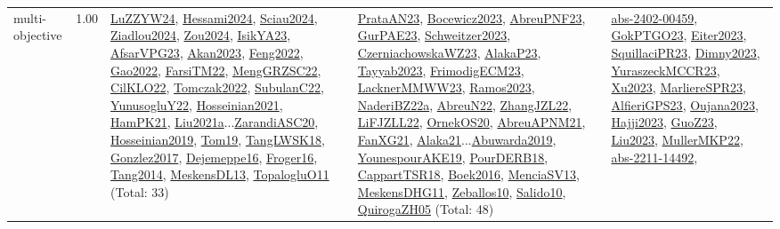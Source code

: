 {\begin{longtable}{p{3cm}r>{\raggedright\arraybackslash}p{6cm}>{\raggedright\arraybackslash}p{6cm}>{\raggedright\arraybackslash}p{8cm}}
\index{multi-objective}\index{Concepts!multi-objective}multi-objective &  1.00 & \hyperref[detail:LuZZYW24]{LuZZYW24}, \hyperref[detail:Hessami2024]{Hessami2024}, \hyperref[detail:Sciau2024]{Sciau2024}, \hyperref[detail:Ziadlou2024]{Ziadlou2024}, \hyperref[detail:Zou2024]{Zou2024}, \hyperref[detail:IsikYA23]{IsikYA23}, \hyperref[detail:AfsarVPG23]{AfsarVPG23}, \hyperref[detail:Akan2023]{Akan2023}, \hyperref[detail:Feng2022]{Feng2022}, \hyperref[detail:Gao2022]{Gao2022}, \hyperref[detail:FarsiTM22]{FarsiTM22}, \hyperref[detail:MengGRZSC22]{MengGRZSC22}, \hyperref[detail:CilKLO22]{CilKLO22}, \hyperref[detail:Tomczak2022]{Tomczak2022}, \hyperref[detail:SubulanC22]{SubulanC22}, \hyperref[detail:YunusogluY22]{YunusogluY22}, \hyperref[detail:Hosseinian2021]{Hosseinian2021}, \hyperref[detail:HamPK21]{HamPK21}, \hyperref[detail:Liu2021a]{Liu2021a}...\hyperref[detail:ZarandiASC20]{ZarandiASC20}, \hyperref[detail:Hosseinian2019]{Hosseinian2019}, \hyperref[detail:Tom19]{Tom19}, \hyperref[detail:TangLWSK18]{TangLWSK18}, \hyperref[detail:Gonzlez2017]{Gonzlez2017}, \hyperref[detail:Dejemeppe16]{Dejemeppe16}, \hyperref[detail:Froger16]{Froger16}, \hyperref[detail:Tang2014]{Tang2014}, \hyperref[detail:MeskensDL13]{MeskensDL13}, \hyperref[detail:TopalogluO11]{TopalogluO11} (Total: 33) & \hyperref[detail:PrataAN23]{PrataAN23}, \hyperref[detail:Bocewicz2023]{Bocewicz2023}, \hyperref[detail:AbreuPNF23]{AbreuPNF23}, \hyperref[detail:GurPAE23]{GurPAE23}, \hyperref[detail:Schweitzer2023]{Schweitzer2023}, \hyperref[detail:CzerniachowskaWZ23]{CzerniachowskaWZ23}, \hyperref[detail:AlakaP23]{AlakaP23}, \hyperref[detail:Tayyab2023]{Tayyab2023}, \hyperref[detail:FrimodigECM23]{FrimodigECM23}, \hyperref[detail:LacknerMMWW23]{LacknerMMWW23}, \hyperref[detail:Ramos2023]{Ramos2023}, \hyperref[detail:NaderiBZ22a]{NaderiBZ22a}, \hyperref[detail:AbreuN22]{AbreuN22}, \hyperref[detail:ZhangJZL22]{ZhangJZL22}, \hyperref[detail:LiFJZLL22]{LiFJZLL22}, \hyperref[detail:OrnekOS20]{OrnekOS20}, \hyperref[detail:AbreuAPNM21]{AbreuAPNM21}, \hyperref[detail:FanXG21]{FanXG21}, \hyperref[detail:Alaka21]{Alaka21}...\hyperref[detail:Abuwarda2019]{Abuwarda2019}, \hyperref[detail:YounespourAKE19]{YounespourAKE19}, \hyperref[detail:PourDERB18]{PourDERB18}, \hyperref[detail:CappartTSR18]{CappartTSR18}, \hyperref[detail:Boek2016]{Boek2016}, \hyperref[detail:MenciaSV13]{MenciaSV13}, \hyperref[detail:MeskensDHG11]{MeskensDHG11}, \hyperref[detail:Zeballos10]{Zeballos10}, \hyperref[detail:Salido10]{Salido10}, \hyperref[detail:QuirogaZH05]{QuirogaZH05} (Total: 48) & \hyperref[detail:abs-2402-00459]{abs-2402-00459}, \hyperref[detail:GokPTGO23]{GokPTGO23}, \hyperref[detail:Eiter2023]{Eiter2023}, \hyperref[detail:SquillaciPR23]{SquillaciPR23}, \hyperref[detail:Dimny2023]{Dimny2023}, \hyperref[detail:YuraszeckMCCR23]{YuraszeckMCCR23}, \hyperref[detail:Xu2023]{Xu2023}, \hyperref[detail:MarliereSPR23]{MarliereSPR23}, \hyperref[detail:AlfieriGPS23]{AlfieriGPS23}, \hyperref[detail:Oujana2023]{Oujana2023}, \hyperref[detail:Hajji2023]{Hajji2023}, \hyperref[detail:GuoZ23]{GuoZ23}, \hyperref[detail:Liu2023]{Liu2023}, \hyperref[detail:MullerMKP22]{MullerMKP22}, \hyperref[detail:abs-2211-14492]{abs-2211-14492}, 
\end{longtable}}
